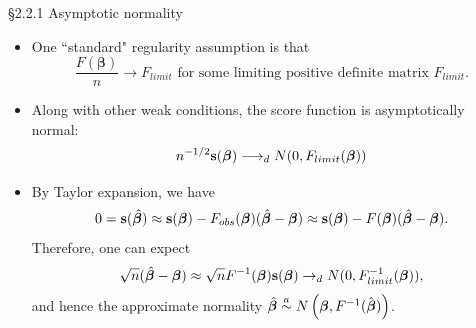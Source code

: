 \documentclass{beamer}
\newcommand{\boldbeta}{{\boldsymbol \beta}}
\begin{document}
\begin{frame} {\S2.2.1  Asymptotic normality}


\begin{itemize}



\item One ``standard" regularity assumption is that
\[
 \frac{F(\boldbeta)}{n}  \longrightarrow F_{limit} \text{ for some limiting positive definite matrix } F_{limit}.
\]

\item Along with other weak conditions, the score function is asymptotically normal:
\[
n^{-1/2} {\bf s} (\boldbeta) \longrightarrow_d N(0, F_{limit}(\boldbeta))
\]


\item By Taylor expansion, we have 
\begin{equation*}
0 = {\bf s} (\hat{\boldbeta}) \approx  {\bf s}(\boldbeta) -  F_{obs} (\boldbeta)(\hat{\boldbeta} - \boldbeta) \approx   {\bf s}(\boldbeta) -  F (\boldbeta)(\hat{\boldbeta} - \boldbeta).
\end{equation*}
Therefore, one can expect
\[
\sqrt{n} (\hat{\boldbeta} - \boldbeta) \approx \sqrt{n} F^{-1}(\boldbeta){\bf s} (\boldbeta) \rightarrow_d N(0, F_{limit}^{-1} (\boldbeta)),
\]
and hence the approximate normality $\hat{\boldbeta} \stackrel{a}{\sim} N
\left(\mbox{\boldmath $\beta$}, F^{-1}(\hat{\mbox{\boldmath $\beta$}})\right)$.
\end{itemize}



\end{frame}
\end{document}
